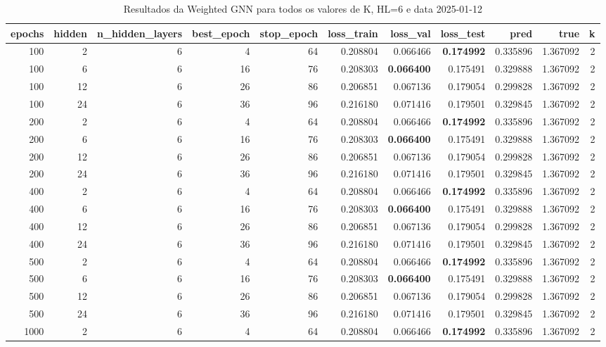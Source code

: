 \begin{table}
\caption{Resultados da Weighted GNN para todos os valores de K, HL=6 e data 2025-01-12}
\label{tab:weighted_gnn_results_allk_hl6_d20250112}
\begin{tabular}{rrrrrrrrrrr}
\toprule
epochs & hidden & n\_hidden\_layers & best\_epoch & stop\_epoch & loss\_train & loss\_val & loss\_test & pred & true & k \\
\midrule
100 & 2 & 6 & 4 & 64 & 0.208804 & 0.066466 & \textbf{0.174992} & 0.335896 & 1.367092 & 2 \\
100 & 6 & 6 & 16 & 76 & 0.208303 & \textbf{0.066400} & 0.175491 & 0.329888 & 1.367092 & 2 \\
100 & 12 & 6 & 26 & 86 & 0.206851 & 0.067136 & 0.179054 & 0.299828 & 1.367092 & 2 \\
100 & 24 & 6 & 36 & 96 & 0.216180 & 0.071416 & 0.179501 & 0.329845 & 1.367092 & 2 \\
200 & 2 & 6 & 4 & 64 & 0.208804 & 0.066466 & \textbf{0.174992} & 0.335896 & 1.367092 & 2 \\
200 & 6 & 6 & 16 & 76 & 0.208303 & \textbf{0.066400} & 0.175491 & 0.329888 & 1.367092 & 2 \\
200 & 12 & 6 & 26 & 86 & 0.206851 & 0.067136 & 0.179054 & 0.299828 & 1.367092 & 2 \\
200 & 24 & 6 & 36 & 96 & 0.216180 & 0.071416 & 0.179501 & 0.329845 & 1.367092 & 2 \\
400 & 2 & 6 & 4 & 64 & 0.208804 & 0.066466 & \textbf{0.174992} & 0.335896 & 1.367092 & 2 \\
400 & 6 & 6 & 16 & 76 & 0.208303 & \textbf{0.066400} & 0.175491 & 0.329888 & 1.367092 & 2 \\
400 & 12 & 6 & 26 & 86 & 0.206851 & 0.067136 & 0.179054 & 0.299828 & 1.367092 & 2 \\
400 & 24 & 6 & 36 & 96 & 0.216180 & 0.071416 & 0.179501 & 0.329845 & 1.367092 & 2 \\
500 & 2 & 6 & 4 & 64 & 0.208804 & 0.066466 & \textbf{0.174992} & 0.335896 & 1.367092 & 2 \\
500 & 6 & 6 & 16 & 76 & 0.208303 & \textbf{0.066400} & 0.175491 & 0.329888 & 1.367092 & 2 \\
500 & 12 & 6 & 26 & 86 & 0.206851 & 0.067136 & 0.179054 & 0.299828 & 1.367092 & 2 \\
500 & 24 & 6 & 36 & 96 & 0.216180 & 0.071416 & 0.179501 & 0.329845 & 1.367092 & 2 \\
1000 & 2 & 6 & 4 & 64 & 0.208804 & 0.066466 & \textbf{0.174992} & 0.335896 & 1.367092 & 2 \\

\end{tabular}
\end{table}
